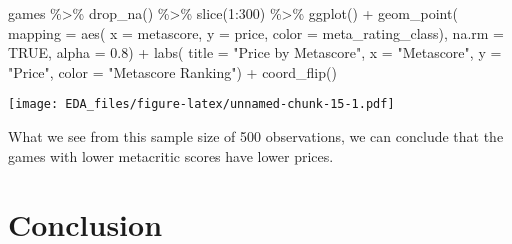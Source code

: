 \documentclass[
]{article}
\newenvironment{Shaded}{\begin{snugshade}}{\end{snugshade}}
\newcommand{\AttributeTok}[1]{\textcolor[rgb]{0.77,0.63,0.00}{#1}}
\newcommand{\ConstantTok}[1]{\textcolor[rgb]{0.00,0.00,0.00}{#1}}
\newcommand{\DecValTok}[1]{\textcolor[rgb]{0.00,0.00,0.81}{#1}}
\newcommand{\FloatTok}[1]{\textcolor[rgb]{0.00,0.00,0.81}{#1}}
\newcommand{\FunctionTok}[1]{\textcolor[rgb]{0.00,0.00,0.00}{#1}}
\newcommand{\NormalTok}[1]{#1}
\newcommand{\SpecialCharTok}[1]{\textcolor[rgb]{0.00,0.00,0.00}{#1}}
\newcommand{\StringTok}[1]{\textcolor[rgb]{0.31,0.60,0.02}{#1}}
\begin{document}
\begin{Shaded}
\begin{Highlighting}[]
\NormalTok{games }\SpecialCharTok{\%\textgreater{}\%} 
  \FunctionTok{drop\_na}\NormalTok{() }\SpecialCharTok{\%\textgreater{}\%}
  \FunctionTok{slice}\NormalTok{(}\DecValTok{1}\SpecialCharTok{:}\DecValTok{300}\NormalTok{) }\SpecialCharTok{\%\textgreater{}\%}
  \FunctionTok{ggplot}\NormalTok{() }\SpecialCharTok{+}
  \FunctionTok{geom\_point}\NormalTok{(}
    \AttributeTok{mapping =} \FunctionTok{aes}\NormalTok{(}
      \AttributeTok{x =}\NormalTok{ metascore, }
      \AttributeTok{y =}\NormalTok{ price, }
      \AttributeTok{color =}\NormalTok{ meta\_rating\_class),}
    \AttributeTok{na.rm =} \ConstantTok{TRUE}\NormalTok{,}
    \AttributeTok{alpha =} \FloatTok{0.8}\NormalTok{) }\SpecialCharTok{+}
  \FunctionTok{labs}\NormalTok{(}
    \AttributeTok{title =} \StringTok{"Price by Metascore"}\NormalTok{, }
    \AttributeTok{x =} \StringTok{"Metascore"}\NormalTok{,}
    \AttributeTok{y =} \StringTok{"Price"}\NormalTok{,}
    \AttributeTok{color =} \StringTok{"Metascore Ranking"}\NormalTok{) }\SpecialCharTok{+}
    \FunctionTok{coord\_flip}\NormalTok{()}
\end{Highlighting}
\end{Shaded}

\texttt{[image: EDA\_files/figure-latex/unnamed-chunk-15-1.pdf]}

What we see from this sample size of 500 observations, we can conclude
that the games with lower metacritic scores have lower prices.

\hypertarget{conclusion}{%
\section{Conclusion}\label{conclusion}}
\end{document}
